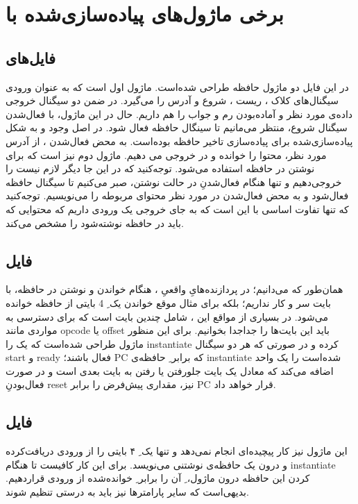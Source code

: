\section*{
	برخی ماژول‌های پیاده‌سازی‌شده با
}

\subsection*{فایل‌های 
}
در این فایل دو ماژول حافظه طراحی شده‌است. ماژول اول
است که به عنوان ورودی سیگنال‌های کلاک
، ریست
، شروع
و آدرس
را می‌گیرد. در ضمن دو سیگنال خروجی داده‌ی مورد نظر
و آماده‌بودن رم و جواب
را هم داریم. حال در این ماژول، با فعال‌شدن سیگنال شروع، منتظر می‌مانیم تا سینگال 
حافظه فعال شود.
در اصل وجود
و 
به شکل پیاده‌سازی‌شده برای پیاده‌سازی تاخیر حافظه بوده‌است.
به محض فعال‌شدن
،
از آدرس مورد نظر، محتوا را خوانده و در 
خروجی می
دهیم.
ماژول دوم نیز
است که برای نوشتن در حافظه استفاده می‌شود.
توجه‌کنید که در این جا دیگر لازم نیست
را خروجی‌دهیم و تنها هنگام
فعال‌شدنِ
در حالت نوشتن، صبر می‌کنیم تا سیگنال
حافظه فعال‌شود و به محض فعال‌شدن در
مورد نظر محتوای مربوطه را می‌نویسیم. توجه‌کنید که تنها تفاوت اساسی با
این است که به جای خروجی
یک ورودی
داریم که محتوایی که باید در حافظه نوشته‌شود را مشخص می‌کند.
\subsection*{
	فایل
}
همان‌طور که می‌دانیم؛ در پردازنده‌هایِ واقعیِ
،
هنگام خواندن و نوشتن در حافظه، با بایت سر و کار نداریم؛ بلکه برای مثال موقع خواندن یک
ِ
4	 بایتی از حافظه خوانده می‌شود. در بسیاری از مواقع این
،
شامل چندین بایت است که برای دسترسی به مواردی مانند opcode یا offset باید این بایت‌ها را جداجدا بخوانیم. برای این منظور ماژول
طراحی شده‌است که یک
را instantiate کرده و در صورتی که هر دو سیگنال start و ready فعال باشند؛ PC که برابر
ِ
حافظه‌ی instantiate شده‌است را یک واحد اضافه می‌کند که معادل یک بایت جلورفتن یا رفتن به بایت بعدی است و در صورت فعال‌بودنِ reset نیز، مقداری پیش‌فرض را برابر PC قرار خواهد داد.
\subsection*{فایل
	}
این ماژول نیز کار پیچیده‌ای انجام نمی‌دهد و تنها یک
ِ
۴ بایتی را از ورودی دریافت‌کرده و درون یک حافظه‌ی نوشتنی
می‌نویسد. برای این کار کافیست تا هنگام instantiate کردن این حافظه درون ماژول،
ِ
آن را برابر 
ِ
خوانده‌شده از ورودی قراردهیم. بدیهی‌است که سایر پارامترها نیز باید به درستی تنظیم شوند.
